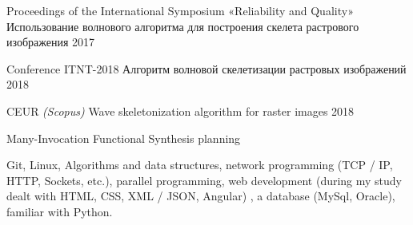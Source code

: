 \documentclass[11pt, a4paper]{awesome-cv}
\begin{document}


\begin{cventries}

  \cventry
    {Proceedings of the International Symposium «Reliability and Quality»} %
    {Использование волнового алгоритма для построения скелета растрового изображения} %
    { } %
    {2017} %
    {
      \begin{cvitems} %
      \end{cvitems}
    }
  \cventry
    {Conference ITNT-2018} %
    {Алгоритм волновой скелетизации растровых изображений} %
    { } %
    {2018} %
    {
\begin{cvitems} %
      \end{cvitems}
    }
    
      \cventry
    {CEUR \textit{(Scopus)}} %
    {Wave skeletonization algorithm for raster images} %
    { } %
    {2018} %
    {
      \begin{cvitems} %
      \end{cvitems}
    }
    
    
    \cventry
    {} %
    {Many-Invocation Functional Synthesis} %
    { } %
    {planning} %
    {
      \begin{cvitems} %
      \end{cvitems}
    }
\end{cventries}


  \begin{cvparagraph}
Git, Linux, Algorithms and data structures, network programming (TCP / IP, HTTP, Sockets, etc.), parallel programming, web development (during my study dealt with HTML, CSS, XML / JSON, Angular) , a database (MySql, Oracle), familiar with Python.

\end{cvparagraph}
\end{document}
